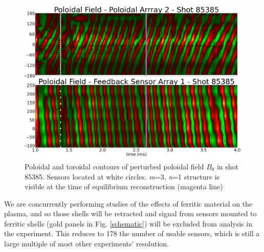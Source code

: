 \documentclass[aps,prl,twocolumn,superscriptaddress,groupedaddress]{revtex4}  %
\begin{document}
\begin{figure}[htb]
\centering
\includegraphics[scale=.475]{../Plots/stripey_plot_85385_new.png}\caption{Poloidal and toroidal contours of perturbed poloidal field $B_\theta$ in shot 85385.  Sensors located at white circles.  \textit{m}=3, \textit{n}=1 structure is visible at the time of equilibrium reconstruction (magenta line)}
\label{Stripey_85385}
\end{figure}
	We are concurrently performing studies of the effects of ferritic material on the plasma, and so those shells will be retracted and signal from sensors mounted to ferritic shells (gold panels in Fig. \ref{schematic})  will be excluded from analysis in the experiment.  This reduces to 178 the number of usable sensors, which is still a large multiple of most other experiments' resolution.
\end{document}
